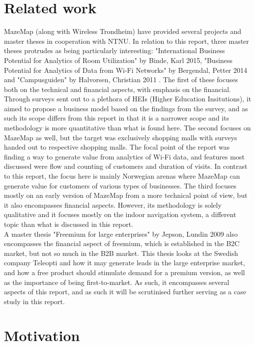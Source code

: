 \section {Related work}
MazeMap (along with Wireless Trondheim) have provided several projects and master theses in cooperation with NTNU. In relation to this report, three master theses protrudes as being particularly interesting: "International Business Potential for Analytics of Room Utilization" by Binde, Karl 2015, "Business Potential for Analytics of Data from Wi-Fi Networks" by Bergendal, Petter 2014 and "Campusguiden" by Halvorsen, Christian 2011 \cite{petterbergendal2014}\cite{karlbernhoffbinde2015}\cite{christianhalvorsen2011}. The first of these focuses both on the technical and financial aspects, with emphasis on the financial. Through surveys sent out to a plethora of HEIs (Higher Education Insitutions), it aimed to propose a business model based on the findings from the survey, and as such its scope differs from this report in that it is a narrower scope and its methodology is more quantitative than what is found here. The second focuses on MazeMap as well, but the target was exclusively shopping malls with surveys handed out to respective shopping malls. The focal point of the report was finding a way to generate value from analytics of Wi-Fi data, and features most discussed were flow and counting of customers and duration of visits. In contrast to this report, the focus here is mainly Norwegian arenas where MazeMap can generate value for customers of various types of businesses. The third focuses mostly on an early version of MazeMap from a more technical point of view, but it also encompasses financial aspects. However, its methodology is solely qualitative and it focuses mostly on the indoor navigation system, a different topic than what is discussed in this report. 
\newline
\\
A master thesis "Freemium for large enterprises" by Jepson, Lundin 2009 \cite{annajepsonelinlundin2009} also encompasses the financial aspect of freemium, which is established in the B2C market, but not so much in the B2B market. This thesis looks at the Swedish company Teleopti and how it may generate leads in the large enterprise market, and how a free product should stimulate demand for a premium version, as well as the importance of being first-to-market. As such, it encompasses several aspects of this report, and as such it will be scrutinised further serving as a case study in this report.
\section {Motivation}